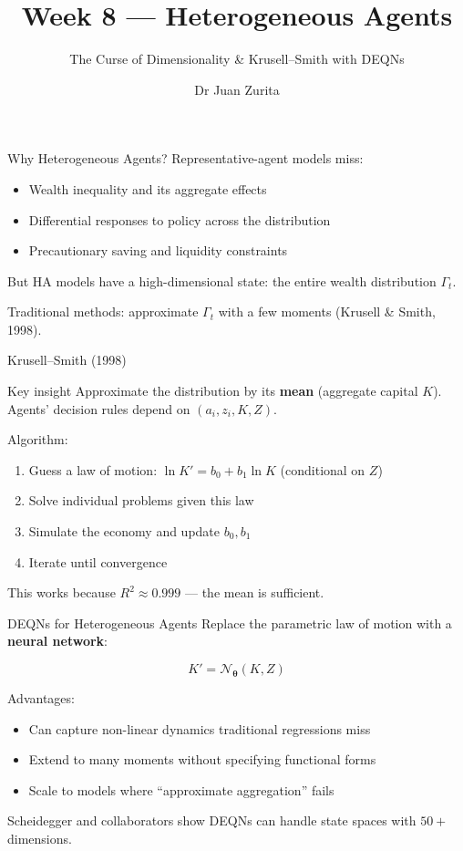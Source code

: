 \documentclass[aspectratio=169, 10pt]{beamer}
\title{Week 8 --- Heterogeneous Agents}
\subtitle{The Curse of Dimensionality \& Krusell--Smith with DEQNs}
\author{Dr Juan Zurita}
\institute{Deep Learning for Macroeconomics\\
The University of Edinburgh~$\cdot$~School of Economics}
\date{}
\begin{document}
\maketitle

\begin{frame}{Why Heterogeneous Agents?}
Representative-agent models miss:

\bigskip
\begin{itemize}
\item Wealth inequality and its aggregate effects
\item Differential responses to policy across the distribution
\item Precautionary saving and liquidity constraints
\end{itemize}

\bigskip
But HA models have a \alert{high-dimensional} state: the entire wealth distribution $\Gamma_t$.

Traditional methods: approximate $\Gamma_t$ with a few moments (Krusell \& Smith, 1998).
\end{frame}

\begin{frame}{Krusell--Smith (1998)}
\begin{block}{Key insight}
Approximate the distribution by its \textbf{mean} (aggregate capital $K$). Agents' decision rules depend on $(a_i, z_i, K, Z)$.
\end{block}

\bigskip
Algorithm:
\begin{enumerate}
\item Guess a law of motion: $\ln K' = b_0 + b_1 \ln K$ (conditional on $Z$)
\item Solve individual problems given this law
\item Simulate the economy and update $b_0, b_1$
\item Iterate until convergence
\end{enumerate}

\bigskip
This works because $R^2 \approx 0.999$ --- the mean is sufficient.
\end{frame}

\begin{frame}{DEQNs for Heterogeneous Agents}
Replace the parametric law of motion with a \textbf{neural network}:

$$K' = \mathcal{N}_{\boldsymbol{\theta}}(K, Z)$$

\bigskip
Advantages:
\begin{itemize}
\item Can capture non-linear dynamics traditional regressions miss
\item Extend to many moments without specifying functional forms
\item Scale to models where ``approximate aggregation'' fails
\end{itemize}

\bigskip
Scheidegger and collaborators show DEQNs can handle state spaces with $50+$ dimensions.
\end{frame}
\end{document}
